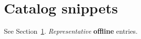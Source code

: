 \documentclass{article}
\begin{document}
\section{Catalog snippets}\label{sec:catalog}
See Section~\ref{sec:catalog}. \emph{Representative} \textbf{offline} entries.
\end{document}

